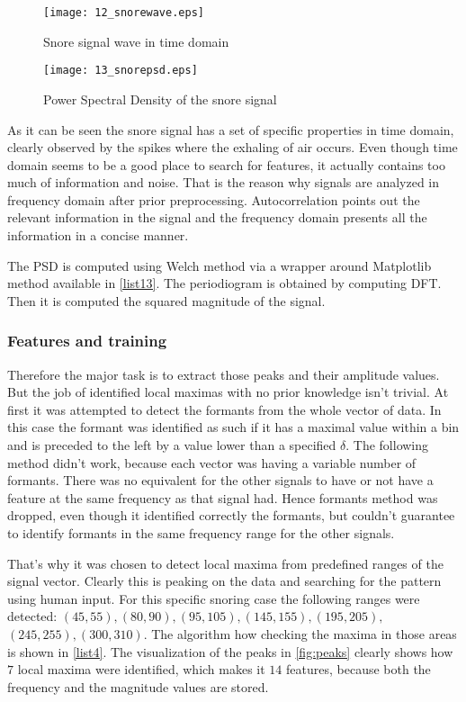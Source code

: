 \begin{figure}[!ht]
\centering
  \texttt{[image: 12\_snorewave.eps]}
\caption{Snore signal wave in time domain}
\label{fig:snorewave}
\end{figure}

\begin{figure}[!ht]
\centering
  \texttt{[image: 13\_snorepsd.eps]}
\caption{Power Spectral Density of the snore signal}
\label{fig:snorepsd}
\end{figure}

As it can be seen the snore signal has a set of specific properties in time domain, clearly observed by the spikes where the exhaling of air occurs. Even though time domain seems to be a good place to search for features, it actually contains too much of information and noise. That is the reason why signals are analyzed in frequency domain after prior preprocessing. Autocorrelation points out the relevant information in the signal and the frequency domain presents all the information in a concise manner.

The PSD is computed using Welch method via a wrapper around Matplotlib method available in \ref{list13}. The periodiogram is obtained by computing DFT. Then it is computed the squared magnitude of the signal. 




\subsubsection{Features and training}

Therefore the major task is to extract those peaks and their amplitude values. But the job of identified local maximas with no prior knowledge isn't trivial. At first it was attempted to detect the formants from the whole vector of data. In this case the formant was identified as such if it has a maximal value within a bin and is preceded to the left by a value lower than a specified $\delta$. The following method didn't work, because each vector was having a variable number of formants. There was no equivalent for the other signals to have or not have a feature at the same frequency as that signal had. Hence formants method was dropped, even though it identified correctly the formants, but couldn't guarantee to identify formants in the same frequency range for the other signals.

That's why it was chosen to detect local maxima from predefined ranges of the signal vector. Clearly this is peaking on the data and searching for the pattern using human input. For this specific snoring case the following ranges were detected: $(45, 55), (80, 90), (95, 105), (145, 155), (195, 205),$ $ (245, 255), (300, 310)$. The algorithm how checking the maxima in those areas is shown in \ref{list4}. The visualization of the peaks in \ref{fig:peaks} clearly shows how $7$ local maxima were identified, which makes it $14$ features, because both the frequency and the magnitude values are stored.

